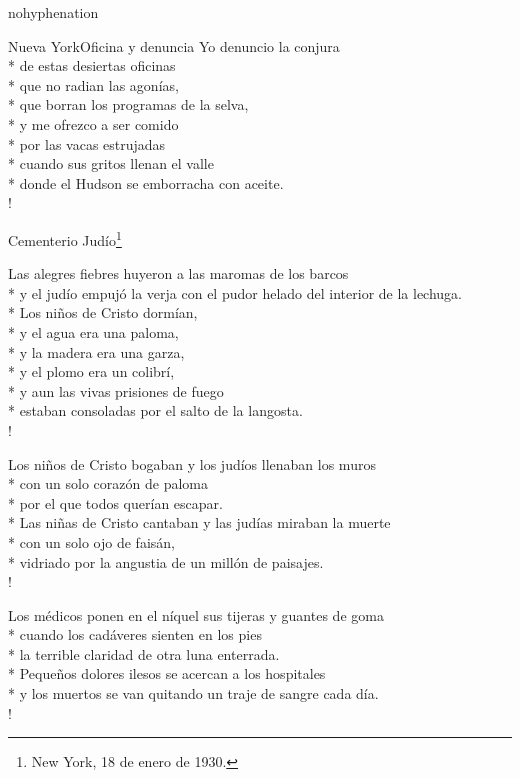 \documentclass[
    a5paper,
    DIV=10,
    12pt,
    notitlepage,
    oneside,]
{scrbook} %
\begin{document}
\begin{hyphenrules}{nohyphenation}
\begin{poem}{Nueva York}{Oficina y denuncia}{}
Yo denuncio la conjura\\*
de estas desiertas oficinas\\*
que no radian las agonías,\\*
que borran los programas de la selva,\\*
y me ofrezco a ser comido\\*
por las vacas estrujadas\\*
cuando sus gritos llenan el valle\\*
donde el Hudson se emborracha con aceite.\\!

\end{poem}

\begin{poem}{Cementerio Judío}{\footnote{New York, 18 de enero de 1930.}}{\vspace{-1em}}

Las alegres fiebres huyeron a las maromas de los barcos \\*
y el judío empujó la verja con el pudor helado del interior de la lechuga.\\*
Los niños de Cristo dormían,\\*
y el agua era una paloma,\\*
y la madera era una garza,\\*
y el plomo era un colibrí,\\*
y aun las vivas prisiones de fuego\\*
estaban consoladas por el salto de la langosta.\\!

Los niños de Cristo bogaban y los judíos llenaban los muros\\*
con un solo corazón de paloma\\*
por el que todos querían escapar.\\*
Las niñas de Cristo cantaban y las judías miraban la muerte\\*
con un solo ojo de faisán,\\*
vidriado por la angustia de un millón de paisajes.\\!

Los médicos ponen en el níquel sus tijeras y guantes de goma\\*
cuando los cadáveres sienten en los pies\\*
la terrible claridad de otra luna enterrada.\\*
Pequeños dolores ilesos se acercan a los hospitales\\*
y los muertos se van quitando un traje de sangre cada día.\\!


\end{poem}
\end{hyphenrules}
\end{document}
